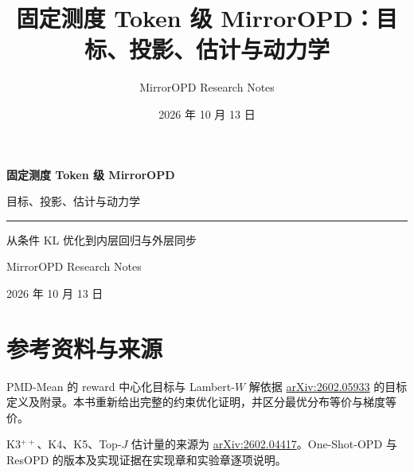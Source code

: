 \documentclass[lang=cn,scheme=chinese,openany]{elegantbook}
\title{固定测度 Token 级 MirrorOPD：目标、投影、估计与动力学}
\author{MirrorOPD Research Notes}
\date{2026 年 10 月 13 日}
\begin{document}
\begin{titlepage}
\centering
\vspace*{35mm}
{\Huge\bfseries 固定测度 Token 级 MirrorOPD\par}
\vspace{12mm}
{\Large 目标、投影、估计与动力学\par}
\vspace{16mm}
{\color{structurecolor}\rule{0.8\textwidth}{1pt}\par}
\vspace{12mm}
{\large 从条件 KL 优化到内层回归与外层同步\par}
\vfill
{\large MirrorOPD Research Notes\par}
\vspace{5mm}
{\large 2026 年 10 月 13 日\par}
\vspace{20mm}
\end{titlepage}
\frontmatter

\tableofcontents
\mainmatter









\backmatter
\chapter*{参考资料与来源}
\begingroup\raggedright
PMD-Mean 的 reward 中心化目标与 Lambert-$W$ 解依据 \href{https://arxiv.org/abs/2602.05933}{arXiv:2602.05933} 的目标定义及附录。本书重新给出完整的约束优化证明，并区分最优分布等价与梯度等价。
\par
K3$^{++}$、K4、K5、Top-$J$ 估计量的来源为 \href{https://arxiv.org/abs/2602.04417}{arXiv:2602.04417}。One-Shot-OPD 与 ResOPD 的版本及实现证据在实现章和实验章逐项说明。
\par\endgroup
\end{document}
